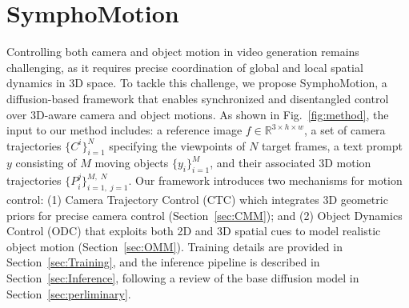 \section{SymphoMotion}
\label{sec:Method}



Controlling both camera and object motion in video generation remains challenging, as it requires precise coordination of global and local spatial dynamics in 3D space. To tackle this challenge, we propose SymphoMotion, a diffusion-based framework that enables synchronized and disentangled control over 3D-aware camera and object motions. As shown in Fig.~\ref{fig:method}, the input to our method includes: a reference image $f\in\mathbb{R}^{3\times h\times w}$, a set of camera trajectories $\{C^i\}_{i=1}^N$ specifying the viewpoints of $N$ target frames, a text prompt $y$ consisting of $M$ moving objects $\{y_{i}\}_{i=1}^M$, and their associated 3D motion trajectories $\{ P_{i}^{j} \}_{i=1,\; j=1}^{M,\; N}$. Our framework introduces two mechanisms for motion control:
(1) Camera Trajectory Control (CTC) which integrates 3D geometric priors for precise camera control (Section~\ref{sec:CMM}); and
(2) Object Dynamics Control (ODC) that exploits both 2D and 3D spatial cues to model realistic object motion (Section~\ref{sec:OMM}).
Training details are provided in Section~\ref{sec:Training}, and the inference pipeline is described in Section~\ref{sec:Inference}, following a review of the base diffusion model in Section~\ref{sec:perliminary}.

